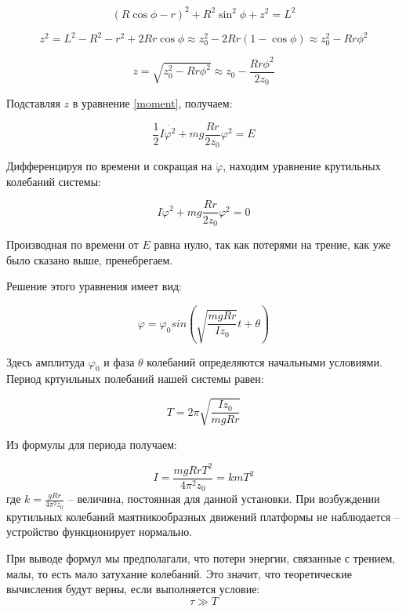 \documentclass[a4paper]{article}
\begin{document}
	\begin{center}
		\[ (R\cos\phi - r)^2 + R^2\sin^2\phi + z^2 = L^2 \]
		
		\[ z^2 = L^2 - R^2 - r^2 + 2Rr\cos\phi \approx z^2_{0} - 2Rr(1 - \cos\phi) \approx z^2_{0} - Rr\phi^2 \]
		
		\[ z = \sqrt{z^2_{0} - Rr\phi^2} \approx z_{0} - \frac{Rr\phi^2}{2z_{0}}\]
	\end{center}

	Подставляя $z$ в уравнение \eqref{moment}, получаем:
	
	\begin{equation}
		\frac{1}{2}I\dot{\varphi^2} + mg \frac{Rr}{2z_0}\varphi^2 = E
	\end{equation}
	
	Дифференцируя по времени и сокращая на $\dot\varphi$, находим уравнение крутильных колебаний системы:
	
	\begin{equation}
		I\ddot\varphi^2 + mg\frac{Rr}{2z_0}\varphi^2 = 0
	\end{equation}
		
	Производная по времени от $E$ равна нулю, так как потерями на трение, как уже было сказано выше, пренебрегаем.
	
	Решение этого уравнения имеет вид:
	
	\begin{equation}
		\varphi = \varphi_0 sin \left(\sqrt{\frac{mgRr}{Iz_0}}t + \theta\right)
	\end{equation}

	Здесь амплитуда $\varphi_0$ и фаза $\theta$ колебаний определяются начальными условиями. Период кртуильных полебаний нашей системы равен:
	
	\begin{equation}
		T = 2\pi \sqrt{\frac{Iz_0}{mgRr}}
	\end{equation}

	Из формулы для периода получаем:
	
	\begin{equation}\label{momin}
		I = \frac{mgRrT^2}{4 \pi^2z_0} = kmT^2
	\end{equation}
	\noindent где $k = \frac{gRr}{4\pi^2z_0}$ -- величина, постоянная для данной установки.
	При возбуждении крутильных колебаний маятникообразных движений платформы не наблюдается -- устройство функционирует нормально.
	
	При выводе формул мы предполагали, что потери энергии, связанные с трением, малы, то есть мало затухание колебаний. Это значит, что теоретические вычисления будут верны, если выполняется условие:
 	\begin{equation}
		\tau \gg T
	\end{equation}
\end{document}
